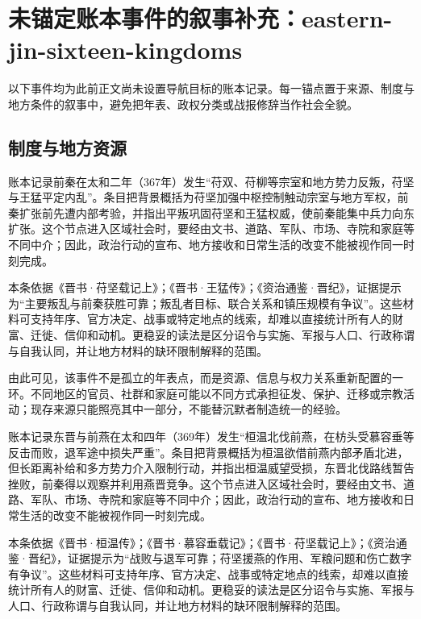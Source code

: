\section{未锚定账本事件的叙事补充：eastern-jin-sixteen-kingdoms}

\label{sec:anchor-batch-two-eastern-jin-sixteen-kingdoms}

以下事件均为此前正文尚未设置导航目标的账本记录。每一锚点置于来源、制度与地方条件的叙事中，避免把年表、政权分类或战报修辞当作社会全貌。

\subsection{制度与地方资源}

账本记录前秦在太和二年（367年）发生“苻双、苻柳等宗室和地方势力反叛，苻坚与王猛平定内乱”。条目把背景概括为苻坚加强中枢控制触动宗室与地方军权，前秦扩张前先遭内部考验，并指出平叛巩固苻坚和王猛权威，使前秦能集中兵力向东扩张。这个节点进入区域社会时，要经由文书、道路、军队、市场、寺院和家庭等不同中介；因此，政治行动的宣布、地方接收和日常生活的改变不能被视作同一时刻完成。

本条依据《晋书·苻坚载记上》；《晋书·王猛传》；《资治通鉴·晋纪》，证据提示为“主要叛乱与前秦获胜可靠；叛乱者目标、联合关系和镇压规模有争议”。这些材料可支持年序、官方决定、战事或特定地点的线索，却难以直接统计所有人的财富、迁徙、信仰和动机。更稳妥的读法是区分诏令与实施、军报与人口、行政称谓与自我认同，并让地方材料的缺环限制解释的范围。

由此可见，该事件不是孤立的年表点，而是资源、信息与权力关系重新配置的一环。不同地区的官员、社群和家庭可能以不同方式承担征发、保护、迁移或宗教活动；现存来源只能照亮其中一部分，不能替沉默者制造统一的经验。

账本记录东晋与前燕在太和四年（369年）发生“桓温北伐前燕，在枋头受慕容垂等反击而败，退军途中损失严重”。条目把背景概括为桓温欲借前燕内部矛盾北进，但长距离补给和多方势力介入限制行动，并指出桓温威望受损，东晋北伐路线暂告挫败，前秦得以观察并利用燕晋竞争。这个节点进入区域社会时，要经由文书、道路、军队、市场、寺院和家庭等不同中介；因此，政治行动的宣布、地方接收和日常生活的改变不能被视作同一时刻完成。

本条依据《晋书·桓温传》；《晋书·慕容垂载记》；《晋书·苻坚载记上》；《资治通鉴·晋纪》，证据提示为“战败与退军可靠；苻坚援燕的作用、军粮问题和伤亡数字有争议”。这些材料可支持年序、官方决定、战事或特定地点的线索，却难以直接统计所有人的财富、迁徙、信仰和动机。更稳妥的读法是区分诏令与实施、军报与人口、行政称谓与自我认同，并让地方材料的缺环限制解释的范围。

